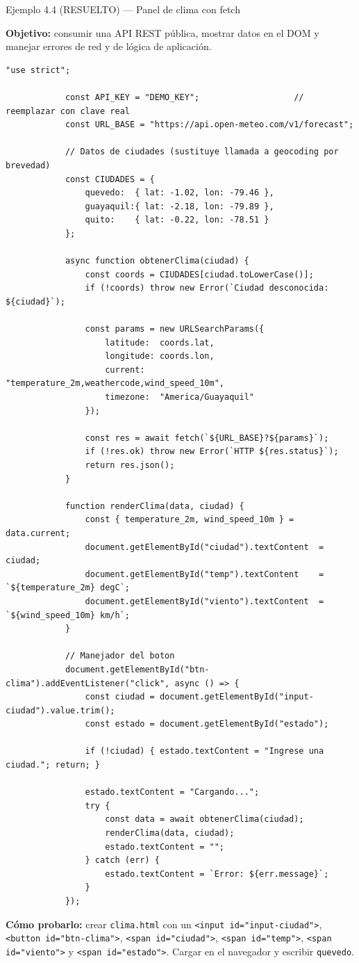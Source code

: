 \documentclass[11pt,a4paper,openany]{book}
\begin{document}
	\begin{cajaejemplo}{Ejemplo 4.4 (RESUELTO) — Panel de clima con fetch}
		
		\textbf{Objetivo:} consumir una API REST pública, mostrar datos
		en el DOM y manejar errores de red y de lógica de aplicación.
		
		\begin{lstlisting}[style=js,caption={clima.js -- modulo completo},label=lst:4.18]
			"use strict";
			
			const API_KEY = "DEMO_KEY";                   // reemplazar con clave real
			const URL_BASE = "https://api.open-meteo.com/v1/forecast";
			
			// Datos de ciudades (sustituye llamada a geocoding por brevedad)
			const CIUDADES = {
				quevedo:  { lat: -1.02, lon: -79.46 },
				guayaquil:{ lat: -2.18, lon: -79.89 },
				quito:    { lat: -0.22, lon: -78.51 }
			};
			
			async function obtenerClima(ciudad) {
				const coords = CIUDADES[ciudad.toLowerCase()];
				if (!coords) throw new Error(`Ciudad desconocida: ${ciudad}`);
				
				const params = new URLSearchParams({
					latitude:  coords.lat,
					longitude: coords.lon,
					current:   "temperature_2m,weathercode,wind_speed_10m",
					timezone:  "America/Guayaquil"
				});
				
				const res = await fetch(`${URL_BASE}?${params}`);
				if (!res.ok) throw new Error(`HTTP ${res.status}`);
				return res.json();
			}
			
			function renderClima(data, ciudad) {
				const { temperature_2m, wind_speed_10m } = data.current;
				document.getElementById("ciudad").textContent  = ciudad;
				document.getElementById("temp").textContent    = `${temperature_2m} degC`;
				document.getElementById("viento").textContent  = `${wind_speed_10m} km/h`;
			}
			
			// Manejador del boton
			document.getElementById("btn-clima").addEventListener("click", async () => {
				const ciudad = document.getElementById("input-ciudad").value.trim();
				const estado = document.getElementById("estado");
				
				if (!ciudad) { estado.textContent = "Ingrese una ciudad."; return; }
				
				estado.textContent = "Cargando...";
				try {
					const data = await obtenerClima(ciudad);
					renderClima(data, ciudad);
					estado.textContent = "";
				} catch (err) {
					estado.textContent = `Error: ${err.message}`;
				}
			});
		\end{lstlisting}
		
		\textbf{Cómo probarlo:} crear \texttt{clima.html} con un
		\texttt{<input id="input-ciudad">}, \texttt{<button id="btn-clima">},
		\texttt{<span id="ciudad">}, \texttt{<span id="temp">},
		\texttt{<span id="viento">} y \texttt{<span id="estado">}.
		Cargar en el navegador y escribir \texttt{quevedo}.
	\end{cajaejemplo}
	
\end{document}
